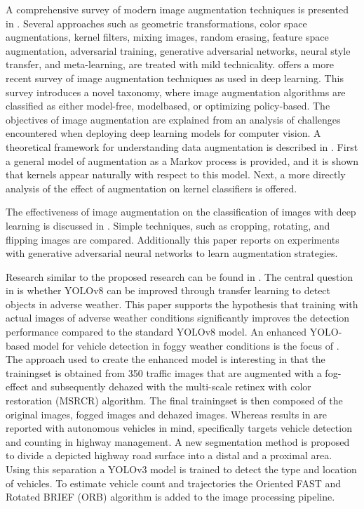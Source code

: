 \documentclass[]{article}
\begin{document}
	A comprehensive survey of modern image augmentation techniques is presented in \cite{shortenSurveyImageData2019}. Several approaches such as geometric transformations, color space augmentations, kernel filters, mixing images, random erasing, feature space augmentation, adversarial training, generative adversarial networks, neural style transfer, and meta-learning, are treated with mild technicality. \cite{xuComprehensiveSurveyImage2023} offers a more recent survey of image augmentation techniques as used in deep learning. This survey introduces a novel taxonomy, where image augmentation algorithms are classified as either model-free, modelbased, or optimizing policy-based. The objectives of image augmentation are explained from an analysis of challenges encountered when deploying deep learning models for computer vision. A theoretical framework for understanding data augmentation is described in \cite{daoKernelTheoryModern2019}. First a general model of augmentation as a Markov process is provided, and it is shown that kernels appear naturally with respect to this model. Next, a more directly analysis of the effect of augmentation on kernel classifiers is offered.
	
	The effectiveness of image augmentation on the classification of images with deep learning is discussed in \cite{perezEffectivenessDataAugmentation2017}. Simple techniques, such as cropping,	rotating, and flipping images are compared. Additionally this paper reports on experiments with generative adversarial neural networks to learn augmentation strategies. 
	
	Research similar to the proposed research can be found in \cite{kumarObjectDetectionAdverse2023}. The central question in \cite{kumarObjectDetectionAdverse2023} is whether YOLO{\small v8} can be improved through transfer learning to detect objects in adverse weather. This paper supports the hypothesis that training with actual images of adverse weather conditions significantly improves the detection performance compared to the standard YOLO{\small v8} model. An enhanced YOLO-based model for vehicle detection in foggy weather conditions is the focus of \cite{liVehicleDetectionFoggy2022}. The approach used to create the enhanced model is interesting in that the trainingset is obtained from 350 traffic images that are augmented with a fog-effect and subsequently dehazed with the multi-scale retinex with color restoration (MSRCR) algorithm. The final trainingset is then composed of the original images, fogged images and dehazed images. Whereas results in \cite{liVehicleDetectionFoggy2022} are reported with autonomous vehicles in mind, \cite{songVisionbasedVehicleDetection2019} specifically targets vehicle detection and counting in highway management.  A new segmentation method is proposed to divide a depicted highway road surface into a distal and a proximal area. Using this separation a YOLO{\small v3} model is trained to detect the type and location of vehicles. To estimate vehicle count and trajectories the Oriented FAST and Rotated BRIEF (ORB) algorithm is added to the image processing pipeline.
	
\end{document}
